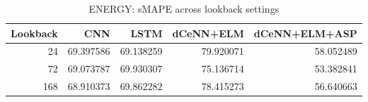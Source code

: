 \begin{table}
\caption{ENERGY: sMAPE across lookback settings}
\begin{tabular}{rrrrr}
\toprule
Lookback & CNN & LSTM & dCeNN+ELM & dCeNN+ELM+ASP \\
\midrule
24 & 69.397586 & 69.138259 & 79.920071 & 58.052489 \\
72 & 69.073787 & 69.930307 & 75.136714 & 53.382841 \\
168 & 68.910373 & 69.862282 & 78.415273 & 56.640663 \\
\bottomrule
\end{tabular}
\end{table}

